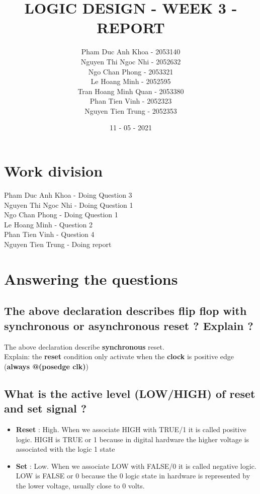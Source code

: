 \documentclass [12pt] {article}
\title {LOGIC DESIGN - WEEK 3 - REPORT}
\author{Pham Duc Anh Khoa - 2053140 \\
				Nguyen Thi Ngoc Nhi - 2052632\\
				Ngo Chan Phong - 2053321 \\
				Le Hoang Minh - 2052595 \\
				Tran Hoang Minh Quan - 2053380 \\
				Phan Tien Vinh - 2052323\\
				Nguyen Tien Trung - 2052353}
\date{11 - 05 - 2021}
\begin{document}
	\maketitle 
	\newpage
	
	\section * {Work division}
		Pham Duc Anh Khoa - Doing Question 3 \\
		Nguyen Thi Ngoc Nhi - Doing Question 1 \\
		Ngo Chan Phong - Doing Question 1 \\
		Le Hoang Minh - Question 2 \\
		Phan Tien Vinh - Question 4 \\
		Nguyen Tien Trung - Doing report
		
	\section  {Answering the questions}
		\subsection {The above declaration describes flip flop with synchronous or asynchronous reset ? Explain ?}
			The above declaration describe \textbf{synchronous} reset. \\
			Explain: the \textbf{reset} condition only activate when the \textbf{clock} is positive edge (\textbf{always @(posedge clk)})\\

		\subsection {What is the active level (LOW/HIGH) of reset and set signal ?}
			\begin {itemize}
				\item \textbf{Reset} : High. When we associate HIGH with TRUE/1 it is called positive logic. HIGH is TRUE or 1 because in digital hardware the higher voltage is associated with the logic 1 state
				\item \textbf{Set} : Low. When we associate LOW with FALSE/0  it is called negative logic. LOW is FALSE or 0 because the 0 logic state in hardware is represented by the lower voltage, usually close to 0 volts.
			\end {itemize}
			
\end{document}
